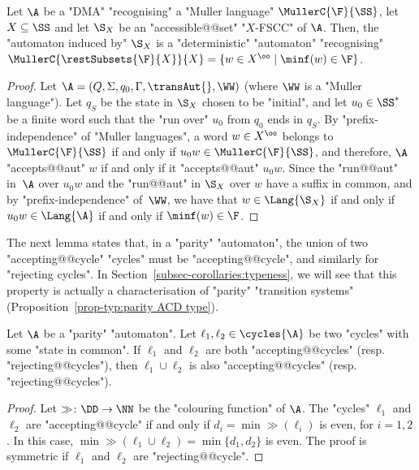 \documentclass{theoretics}
\begin{document}
\begin{lemma}\label{lemma-ZT:X-FSCC-induce-automata}
	Let $\A$ be a "DMA" "recognising" a "Muller language" $\MullerC{\F}{\SS}$, let $X\subseteq \SS$ and let $\S_X$ be an "accessible@@set" "$X$-FSCC" of $\A$. Then, the "automaton induced by" $\S_X$ is a "deterministic" "automaton" "recognising" $\MullerC{\restSubsets{\F}{X}}{X} = \{w\in X^\oo \mid \minf(w)\in \F\}$.
\end{lemma}
\begin{proof}
	Let $\A = (Q,\Sigma, q_0, \Gamma, \transAut{}, \WW)$ (where $\WW$ is a "Muller language"). Let $q_S$ be the state in $\S_X$ chosen to be "initial", and let $u_0\in \SS^*$ be a finite word such that the "run over" $u_0$ from $q_0$ ends in $q_S$.
	By "prefix-independence" of "Muller languages", a word $w\in X^\oo$ belongs to $\MullerC{\F}{\SS}$ if and only if $u_0w\in \MullerC{\F}{\SS}$, and therefore, $\A$ "accepts@@aut" $w$ if and only if it "accepts@@aut" $u_0w$. 
	Since the "run@@aut" in~$\A$ over $u_0w$ and the "run@@aut" in $\S_X$ over $w$ have a suffix in common, and by "prefix-independence" of~$\WW$, we have that $w\in \Lang{\S_X}$ if and only if $u_0w\in \Lang{\A}$ if and only if $\minf(w)\in \F$.
\end{proof}

The next lemma states that, in a "parity" "automaton", the union of two "accepting@@cycle" "cycles" must be "accepting@@cycle", and similarly for "rejecting cycles". 
In Section~\ref{subsec-corollaries:typeness}, we will see that this property is actually a characterisation of "parity" "transition systems" (Proposition~\ref{prop-typ:parity ACD type}).
\begin{lemma}\label{lemma-ZT:union_cycles_parity-TS}
	Let $\A$ be a "parity" "automaton". Let $\ell_1, \ell_2\in \cycles{\A}$ be two "cycles" with some "state in common". If $\ell_1$ and $\ell_2$ are both "accepting@@cycles" (resp. "rejecting@@cycles"), then $\ell_1 \cup \ell_2$ is also "accepting@@cycles" (resp. "rejecting@@cycles").
\end{lemma}
\begin{proof}
	Let $\gg\colon \DD\to \NN$ be the "colouring function" of $\A$. The "cycles" $\ell_1$ and $\ell_2$ are "accepting@@cycle" if and only if $d_i = \min \gg(\ell_i)$ is even, for $i=1,2$. In this case, $\min \gg(\ell_1 \cup \ell_2) = \min\{ d_1, d_2\}$ is even. The proof is symmetric if $\ell_1$ and $\ell_2$ are "rejecting@@cycle".
\end{proof}
\end{document}
